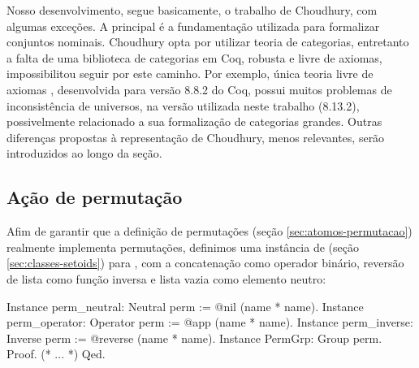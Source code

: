 
Nosso desenvolvimento, segue basicamente, o trabalho de Choudhury, com algumas exceções. A principal é a fundamentação utilizada para formalizar conjuntos nominais. Choudhury opta por utilizar teoria de categorias, entretanto a falta de uma biblioteca de categorias em Coq, robusta e livre de axiomas, impossibilitou seguir por este caminho. Por exemplo, única teoria livre de axiomas \cite{Wiegley}, desenvolvida para versão 8.8.2 do Coq, possui muitos problemas de inconsistência de universos, na versão utilizada neste trabalho (8.13.2), possivelmente relacionado a sua formalização de categorias grandes. Outras diferenças propostas à representação de Choudhury, menos relevantes, serão introduzidos ao longo da seção.

\subsection{Ação de permutação}
Afim de garantir que a definição de permutações (seção \ref{sec:atomos-permutacao}) realmente implementa permutações, definimos uma instância de  (seção \ref{sec:classes-setoids}) para , com a concatenação como operador binário, reversão de lista como função inversa e lista vazia como elemento neutro:
\begin{coqcode}
Instance perm_neutral: Neutral perm := @nil (name * name).
Instance perm_operator: Operator perm := @app (name * name).
Instance perm_inverse: Inverse perm := @reverse (name * name).
Instance PermGrp: Group perm. Proof. (* ... *) Qed.
\end{coqcode}

